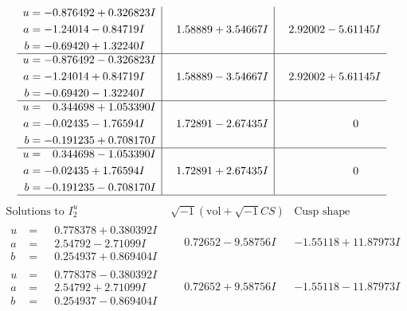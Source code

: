 \documentclass[1p]{elsarticle_modified}
\theoremstyle{definition}
\newcommand{\I}{\sqrt{-1}}
\begin{document}
$$\begin{array}{c|c|c}
\begin{aligned}
u &= -0.876492 + 0.326823 I \\
a &= -1.24014 - 0.84719 I \\
b &= -0.69420 + 1.32240 I\end{aligned}
 & \phantom{-}1.58889 + 3.54667 I & \phantom{-}2.92002 - 5.61145 I \\ \hline\begin{aligned}
u &= -0.876492 - 0.326823 I \\
a &= -1.24014 + 0.84719 I \\
b &= -0.69420 - 1.32240 I\end{aligned}
 & \phantom{-}1.58889 - 3.54667 I & \phantom{-}2.92002 + 5.61145 I \\ \hline\begin{aligned}
u &= \phantom{-}0.344698 + 1.053390 I \\
a &= -0.02435 - 1.76594 I \\
b &= -0.191235 + 0.708170 I\end{aligned}
 & \phantom{-}1.72891 - 2.67435 I & \phantom{-0.000000 } 0 \\ \hline\begin{aligned}
u &= \phantom{-}0.344698 - 1.053390 I \\
a &= -0.02435 + 1.76594 I \\
b &= -0.191235 - 0.708170 I\end{aligned}
 & \phantom{-}1.72891 + 2.67435 I & \phantom{-0.000000 } 0\\
 \hline 
 \end{array}$$\newpage$$\begin{array}{c|c|c}  
\text{Solutions to }I^u_{2}& \I (\text{vol} + \sqrt{-1}CS) & \text{Cusp shape}\\
 \hline 
\begin{aligned}
u &= \phantom{-}0.778378 + 0.380392 I \\
a &= \phantom{-}2.54792 - 2.71099 I \\
b &= \phantom{-}0.254937 + 0.869404 I\end{aligned}
 & \phantom{-}0.72652 - 9.58756 I & -1.55118 + 11.87973 I \\ \hline\begin{aligned}
u &= \phantom{-}0.778378 - 0.380392 I \\
a &= \phantom{-}2.54792 + 2.71099 I \\
b &= \phantom{-}0.254937 - 0.869404 I\end{aligned}
 & \phantom{-}0.72652 + 9.58756 I & -1.55118 - 11.87973 I \\ \hline\begin{aligned}

\end{aligned}
\end{array}$$
\end{document}
